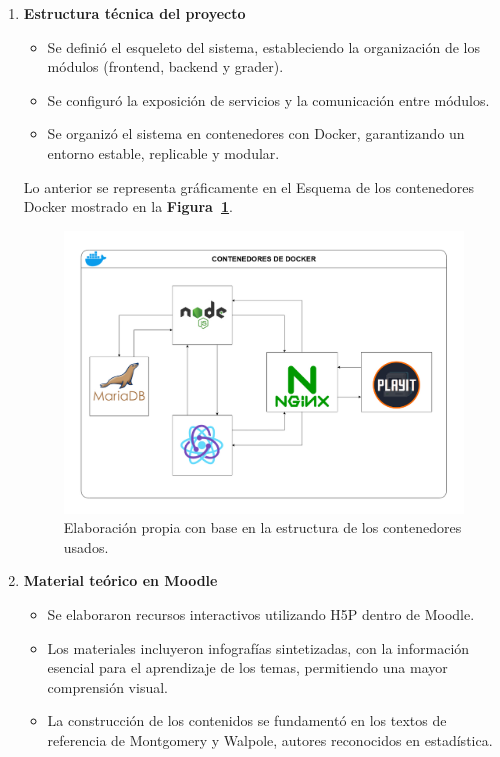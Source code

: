 \documentclass[letter,oneside,12pt,spanish]{report}
\begin{document}
\begin{enumerate}
	\item \textbf{Estructura técnica del proyecto}
	\begin{itemize}
		\item Se definió el esqueleto del sistema, estableciendo la organización de los módulos (frontend, backend y grader).
		\item Se configuró la exposición de servicios y la comunicación entre módulos.
		\item Se organizó el sistema en contenedores con Docker, garantizando un entorno estable, replicable y modular.
	\end{itemize}
	
\noindent Lo anterior se representa gráficamente en el Esquema de los contenedores Docker mostrado en la \textbf{Figura~\ref{fig:Diagrama-Docker}}.

\begin{figure}[ht]
	\centering
	\includegraphics[width=1\textwidth]{Figs/Diagrama_contenedores.pdf}
	\label{fig:Diagrama-Docker}
	\\Elaboración propia con base en la estructura de los contenedores usados.
\end{figure}

    \item \textbf{Material teórico en Moodle}
\begin{itemize}
	\item Se elaboraron recursos interactivos utilizando H5P dentro de Moodle.
	\item Los materiales incluyeron infografías sintetizadas, con la información esencial para el aprendizaje de los temas, permitiendo una mayor comprensión visual.
	\item La construcción de los contenidos se fundamentó en los textos de referencia de Montgomery y Walpole, autores reconocidos en estadística.
\end{itemize}


\end{enumerate}
\end{document}
